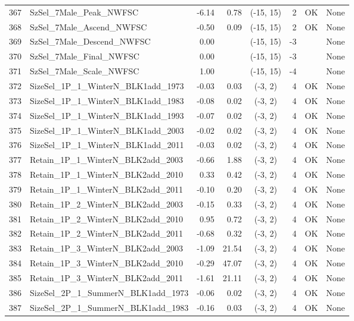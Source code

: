 \documentclass[12pt,]{article}
\begin{document}
\begin{landscape}
\begin{longtable}{rlrrcrcl}
  367 & SzSel\_7Male\_Peak\_NWFSC & -6.14 & 0.78 & (-15, 15) & 2 & OK & None \\ 
  368 & SzSel\_7Male\_Ascend\_NWFSC & -0.50 & 0.09 & (-15, 15) & 2 & OK & None \\ 
  369 & SzSel\_7Male\_Descend\_NWFSC & 0.00 &  & (-15, 15) & -3 &  & None \\ 
  370 & SzSel\_7Male\_Final\_NWFSC & 0.00 &  & (-15, 15) & -3 &  & None \\ 
  371 & SzSel\_7Male\_Scale\_NWFSC & 1.00 &  & (-15, 15) & -4 &  & None \\ 
  372 & SizeSel\_1P\_1\_WinterN\_BLK1add\_1973 & -0.03 & 0.03 & (-3, 2) & 4 & OK & None \\ 
  373 & SizeSel\_1P\_1\_WinterN\_BLK1add\_1983 & -0.08 & 0.02 & (-3, 2) & 4 & OK & None \\ 
  374 & SizeSel\_1P\_1\_WinterN\_BLK1add\_1993 & -0.07 & 0.02 & (-3, 2) & 4 & OK & None \\ 
  375 & SizeSel\_1P\_1\_WinterN\_BLK1add\_2003 & -0.02 & 0.02 & (-3, 2) & 4 & OK & None \\ 
  376 & SizeSel\_1P\_1\_WinterN\_BLK1add\_2011 & -0.03 & 0.02 & (-3, 2) & 4 & OK & None \\ 
  377 & Retain\_1P\_1\_WinterN\_BLK2add\_2003 & -0.66 & 1.88 & (-3, 2) & 4 & OK & None \\ 
  378 & Retain\_1P\_1\_WinterN\_BLK2add\_2010 & 0.33 & 0.42 & (-3, 2) & 4 & OK & None \\ 
  379 & Retain\_1P\_1\_WinterN\_BLK2add\_2011 & -0.10 & 0.20 & (-3, 2) & 4 & OK & None \\ 
  380 & Retain\_1P\_2\_WinterN\_BLK2add\_2003 & -0.15 & 0.33 & (-3, 2) & 4 & OK & None \\ 
  381 & Retain\_1P\_2\_WinterN\_BLK2add\_2010 & 0.95 & 0.72 & (-3, 2) & 4 & OK & None \\ 
  382 & Retain\_1P\_2\_WinterN\_BLK2add\_2011 & -0.68 & 0.32 & (-3, 2) & 4 & OK & None \\ 
  383 & Retain\_1P\_3\_WinterN\_BLK2add\_2003 & -1.09 & 21.54 & (-3, 2) & 4 & OK & None \\ 
  384 & Retain\_1P\_3\_WinterN\_BLK2add\_2010 & -0.29 & 47.07 & (-3, 2) & 4 & OK & None \\ 
  385 & Retain\_1P\_3\_WinterN\_BLK2add\_2011 & -1.61 & 21.11 & (-3, 2) & 4 & OK & None \\ 
  386 & SizeSel\_2P\_1\_SummerN\_BLK1add\_1973 & -0.06 & 0.02 & (-3, 2) & 4 & OK & None \\ 
  387 & SizeSel\_2P\_1\_SummerN\_BLK1add\_1983 & -0.16 & 0.03 & (-3, 2) & 4 & OK & None \\ 

\end{longtable}
\end{landscape}
\end{document}
